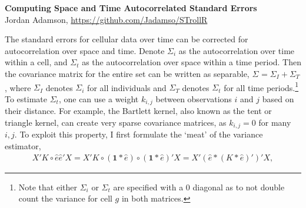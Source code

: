 \RequirePackage{ASetup}


\begin{center}
\textbf{\Large{Computing Space and Time Autocorrelated Standard Errors}}\\
Jordan Adamson, \url{https://github.com/Jadamso/STrollR}
\end{center}
The standard errors for cellular data over time can be corrected for autocorrelation over space and time. Denote $\Sigma_{i}$ as the autocorrelation over time within a cell, and $\Sigma_{t}$ as the autocorrelation over space within a time period. Then the covariance matrix for the entire set can be written as separable,
$\Sigma_{} = \Sigma_{I} + \Sigma_{T}$
, where $\Sigma_{I}$ denotes $\Sigma_{i}$ for all individuals and $\Sigma_{T}$ denotes $\Sigma_{t}$ for all time periods.\footnote{Note that either $\Sigma_{i}$ or $\Sigma_{t}$ are specified with a 0 diagonal as to not double count the variance for cell $g$ in both matrices.} To estimate $\Sigma_{t}$,
one can use a weight $k_{i,j}$ between observations $i$ and $j$ based on their distance. For example, the Bartlett kernel, also known as the tent or triangle kernel, can create very sparse covariance matrices, as $k_{i,j}=0$ for many $i,j$. To exploit this property, I first formulate the `meat' of the variance estimator,
\begin{eqnarray*}
X' K \circ \hat{e} \hat{e}' X
= X' K \circ (\mathbf{1} * \hat{e}) \circ ( \mathbf{1} * \hat{e})' X
= X' (\hat{e} * (K * \hat{e})' )' X,
\end{eqnarray*}

